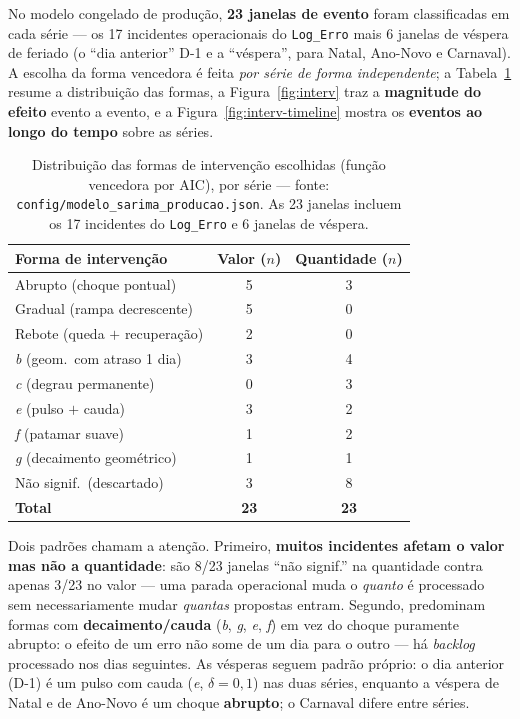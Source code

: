 \documentclass[11pt,a4paper]{article}
\begin{document}
No modelo congelado de produção, \textbf{23 janelas de evento} foram classificadas em cada série
--- os 17 incidentes operacionais do \texttt{Log\_Erro} mais 6 janelas de véspera de feriado (o
``dia anterior'' D-1 e a ``véspera'', para Natal, Ano-Novo e Carnaval). A escolha da forma
vencedora é feita \emph{por série de forma independente}; a Tabela~\ref{tab:efeitos} resume a
distribuição das formas, a Figura~\ref{fig:interv} traz a \textbf{magnitude do efeito} evento a
evento, e a Figura~\ref{fig:interv-timeline} mostra os \textbf{eventos ao longo do tempo} sobre as
séries.

\begin{table}[H]
\centering
\caption{Distribuição das formas de intervenção escolhidas (função vencedora por AIC), por série
--- fonte: \texttt{config/modelo\_sarima\_producao.json}. As 23 janelas incluem os 17 incidentes
do \texttt{Log\_Erro} e 6 janelas de véspera.}
\label{tab:efeitos}
\small
\begin{tabular}{@{}lcc@{}}
\toprule
Forma de intervenção & \textbf{Valor} ($n$) & \textbf{Quantidade} ($n$) \\
\midrule
Abrupto (choque pontual)          & 5 & 3 \\
Gradual (rampa decrescente)       & 5 & 0 \\
Rebote (queda $+$ recuperação)    & 2 & 0 \\
\emph{b} (geom.\ com atraso 1 dia)& 3 & 4 \\
\emph{c} (degrau permanente)      & 0 & 3 \\
\emph{e} (pulso $+$ cauda)        & 3 & 2 \\
\emph{f} (patamar suave)          & 1 & 2 \\
\emph{g} (decaimento geométrico)  & 1 & 1 \\
Não signif.\ (descartado)         & 3 & 8 \\
\midrule
\textbf{Total}                    & \textbf{23} & \textbf{23} \\
\bottomrule
\end{tabular}
\end{table}

Dois padrões chamam a atenção. Primeiro, \textbf{muitos incidentes afetam o valor mas não a
quantidade}: são 8/23 janelas ``não signif.'' na quantidade contra apenas 3/23 no valor --- uma
parada operacional muda o \emph{quanto} é processado sem necessariamente mudar \emph{quantas}
propostas entram. Segundo, predominam formas com \textbf{decaimento/cauda} (\emph{b}, \emph{g},
\emph{e}, \emph{f}) em vez do choque puramente abrupto: o efeito de um erro não some de um dia para
o outro --- há \emph{backlog} processado nos dias seguintes. As vésperas seguem padrão próprio: o
dia anterior (D-1) é um pulso com cauda (\emph{e}, $\delta=0{,}1$) nas duas séries, enquanto a
véspera de Natal e de Ano-Novo é um choque \textbf{abrupto}; o Carnaval difere entre séries.
\end{document}
